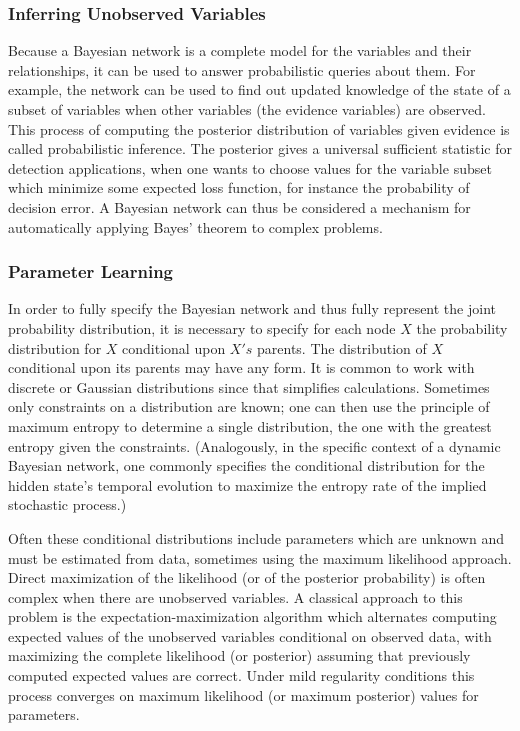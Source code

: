 \subsubsection{Inferring Unobserved Variables}
Because a Bayesian network is a complete model for the variables and their relationships, it can be used to answer probabilistic queries about them. For example, the network can be used to find out updated knowledge of the state of a subset of variables when other variables (the evidence variables) are observed. This process of computing the posterior distribution of variables given evidence is called probabilistic inference. The posterior gives a universal sufficient statistic for detection applications, when one wants to choose values for the variable subset which minimize some expected loss function, for instance the probability of decision error. A Bayesian network can thus be considered a mechanism for automatically applying Bayes' theorem to complex problems.


\subsubsection{Parameter Learning}
In order to fully specify the Bayesian network and thus fully represent the joint probability distribution, it is necessary to specify for each node $X$ the probability distribution for $X$ conditional upon $X's$ parents. The distribution of $X$ conditional upon its parents may have any form. It is common to work with discrete or Gaussian distributions since that simplifies calculations. Sometimes only constraints on a distribution are known; one can then use the principle of maximum entropy to determine a single distribution, the one with the greatest entropy given the constraints. (Analogously, in the specific context of a dynamic Bayesian network, one commonly specifies the conditional distribution for the hidden state's temporal evolution to maximize the entropy rate of the implied stochastic process.)

Often these conditional distributions include parameters which are unknown and must be estimated from data, sometimes using the maximum likelihood approach. Direct maximization of the likelihood (or of the posterior probability) is often complex when there are unobserved variables. A classical approach to this problem is the expectation-maximization algorithm which alternates computing expected values of the unobserved variables conditional on observed data, with maximizing the complete likelihood (or posterior) assuming that previously computed expected values are correct. Under mild regularity conditions this process converges on maximum likelihood (or maximum posterior) values for parameters.

